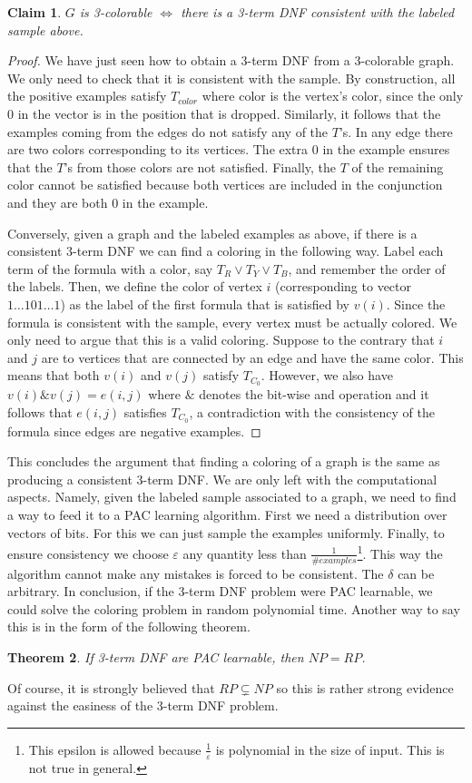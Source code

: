 \documentclass[12pt, letterpaper]{article}
\numberwithin{equation}{section} %
\newcommand{\ve}{\varepsilon}
\newtheorem{theorem}{Theorem}[section]
\newtheorem{claim}[theorem]{Claim}
\theoremstyle{definition}
\theoremstyle{remark}
\begin{document}
\begin{claim}
    $G$ is 3-colorable $\iff$ there is a 3-term DNF \emph{consistent} with the labeled sample above.
\end{claim}
\begin{proof}
    We have just seen how to obtain a 3-term DNF from a 3-colorable graph. We only need to check that it is consistent with the sample. 
    By construction, all the positive examples satisfy $T_{color}$ where color is the vertex's color, since the only 0 in the vector is in the position that is dropped. 
    Similarly, it follows that the examples coming from the edges do not satisfy any of the $T$'s. In any edge there are two colors corresponding to its vertices. 
    The extra 0 in the example ensures that the $T$'s from those colors are not satisfied.
    Finally, the $T$ of the remaining color cannot be satisfied because both vertices are included in the conjunction and they are both 0 in the example.
    
    Conversely, given a graph and the labeled examples as above, if there is a consistent 3-term DNF we can find a coloring in the following way. 
    Label each term of the formula with a color, say $T_R \lor T_Y \lor T_B$, and remember the order of the labels. 
    Then, we define the color of vertex $i$ (corresponding to vector $1\ldots101\ldots1$) as the label of the first formula that is satisfied by $v(i)$. 
    Since the formula is consistent with the sample, every vertex must be actually colored. We only need to argue that this is a valid coloring. 
    Suppose to the contrary that $i$ and $j$ are to vertices that are connected by an edge and have the same color. 
    This means that both $v(i)$ and $v(j)$ satisfy $T_{C_0}$. 
    However, we also have $v(i) \& v(j) = e(i,j)$  where $\&$ denotes the bit-wise and operation and it follows that $e(i,j)$ satisfies $T_{C_0}$, a contradiction with the consistency of the formula since edges are negative examples.
\end{proof}

This concludes the argument that finding a coloring of a graph is the same as producing a consistent 3-term DNF. 
We are only left with the computational aspects.
Namely, given the labeled sample associated to a graph, we need to find a way to feed it to a PAC learning algorithm. 
First we need a distribution over vectors of bits.
For this we can just sample the examples uniformly. 
Finally, to ensure consistency we choose $\ve$ any quantity less than $\frac1{\#examples}$\footnote{This epsilon is allowed because $\frac1\ve$ is polynomial in the size of input. This is not true in general.}. This way the algorithm cannot make any mistakes is forced to be consistent. The $\delta$ can be arbitrary.
In conclusion, if the 3-term DNF problem were PAC learnable, we could solve the coloring problem in random polynomial time. 
Another way to say this is in the form of the following theorem.
\begin{theorem}
    If 3-term DNF are PAC learnable, then $NP = RP$.
\end{theorem}
Of course, it is strongly believed that $RP \subsetneq NP$ so this is rather strong evidence against the easiness of the 3-term DNF problem.
\end{document}
